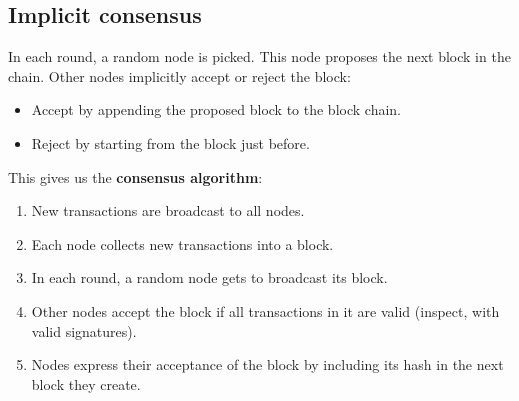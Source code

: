 \documentclass[12pt]{article}
\begin{document}
\subsection*{Implicit consensus}

In each round, a random node is picked. This node proposes the next block in the chain. Other nodes implicitly accept or reject the block:
\begin{itemize}
\item Accept by appending the proposed block to the block chain.
\item Reject by starting from the block just before.
\end{itemize}

This gives us the \textbf{consensus algorithm}:
\begin{enumerate}
\item New transactions are broadcast to all nodes.
\item Each node collects new transactions into a block.
\item In each round, a random node gets to broadcast its block.
\item Other nodes accept the block if all transactions in it are valid (inspect, with valid signatures).
\item Nodes express their acceptance of the block by including its hash in the next block they create.
\end{enumerate}
\end{document}
